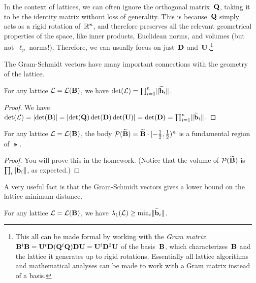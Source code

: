 \documentclass[11pt]{article}
\begin{document}
In the context of lattices, we can often ignore the orthogonal
matrix~$\mathbf{Q}$, taking it to be the identity matrix without loss of
generality. This is because~$\mathbf{Q}$ simply acts as a rigid rotation
of~$\mathbb{R}^{n}$, and therefore preserves all the relevant geometrical
properties of the space, like inner products, Euclidean norms, and
volumes (but not~$\ell_{p}$ norms!). Therefore, we can usually focus
on just~$\mathbf{D}$ and~$\mathbf{U}$.\footnote{This all can be made formal by
  working with the \emph{Gram matrix}
  $\mathbf{B}^{t} \mathbf{B} = \mathbf{U}^{t} \mathbf{D} (\mathbf{Q}^{t} \mathbf{Q}) \mathbf{D} \mathbf{U} =
  \mathbf{U}^{t} \mathbf{D}^{2} \mathbf{U}$ of the basis~$\mathbf{B}$, which
  characterizes~$\mathbf{B}$ and the lattice it generates up to rigid
  rotations. Essentially all lattice algorithms and mathematical
  analyses can be made to work with a Gram matrix instead of a basis.}

\medskip

\noindent The Gram-Schmidt vectors have many important connections
with the geometry of the lattice.

\begin{lemma}
  \label{lem:gs-det}
  For any lattice $\mathcal{L} = \mathcal{L}(\mathbf{B})$, we have
  $\det(\mathcal{L}) = \prod_{i=1}^{n} \lVert\widetilde{\mathbf{b}}_{i}\rVert$.
\end{lemma}

\begin{proof}
  We have
  $\det(\mathcal{L}) = \lvert\det(\mathbf{B})\rvert = \lvert\det(\mathbf{Q}) \det(\mathbf{D})
    \det(\mathbf{U})\rvert = \det(\mathbf{D}) = \prod_{i=1}^{n}
  \lVert\widetilde{\mathbf{b}}_{i}\rVert$.
\end{proof}

\begin{lemma}
  \label{lem:gs-fund-region}
  For any lattice $\mathcal{L} = \mathcal{L}(\mathbf{B})$, the body
  $\mathcal{P}(\widetilde{\mathbf{B}}) = \widetilde{\mathbf{B}} \cdot [-\tfrac12,\tfrac12)^{n}$ is a fundamental
  region of $\lat$.
\end{lemma}

\begin{proof}
  You will prove this in the homework. (Notice that the volume of
  $\mathcal{P}(\widetilde{\mathbf{B}})$ is $\prod_{i} \lVert\widetilde{\mathbf{b}}_{i}\rVert$, as
  expected.)
\end{proof}

\noindent A very useful fact is that the Gram-Schmidt vectors gives a
lower bound on the lattice minimum distance.

\begin{lemma}
  \label{lem:gs-lower-lambda}
  For any lattice $\mathcal{L} = \mathcal{L}(\mathbf{B})$, we have
  $\lambda_1(\mathcal{L}) \geq \min_i \lVert\widetilde{\mathbf{b}}_i\rVert$.
\end{lemma}
\end{document}
